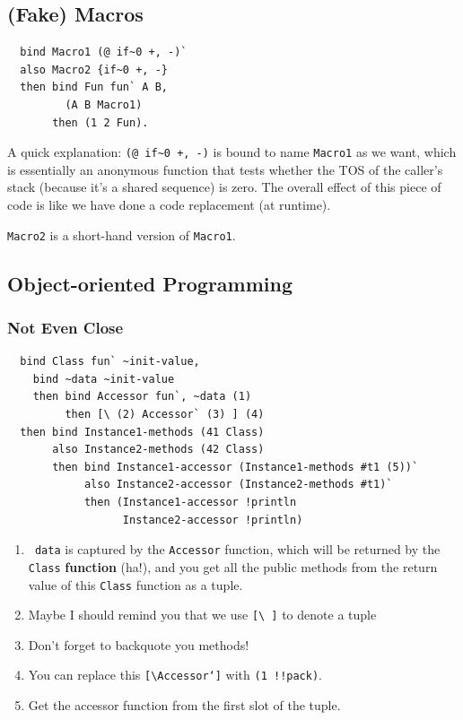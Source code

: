 \documentclass{report}
\newcommand{\mtilde}[1]{\textasciitilde}
\newcommand{\marg}[1]{\texttt{\mtilde ~#1}}
\begin{document}
\subsection{(Fake) Macros}
\label{ssec:macro}
\begin{mdframed}[style=example]
\begin{verbatim}
  bind Macro1 (@ if~0 +, -)`
  also Macro2 {if~0 +, -}
  then bind Fun fun` A B,
         (A B Macro1)
       then (1 2 Fun).
\end{verbatim}
\end{mdframed}

A quick explanation: \texttt{(@ if\textasciitilde 0 +, -)} is bound to name \texttt{Macro1} as we want, which is essentially an anonymous function that tests whether the TOS of the caller's stack (because it's a shared sequence) is zero. The overall effect of this piece of code is like we have done a code replacement (at runtime).

\texttt{Macro2} is a short-hand version of \texttt{Macro1}.

\subsection{Object-oriented Programming}

\subsubsection{Not Even Close}

\begin{mdframed}[style=example]
\begin{verbatim}
  bind Class fun` ~init-value,
    bind ~data ~init-value
    then bind Accessor fun`, ~data (1)
         then [\ (2) Accessor` (3) ] (4)
  then bind Instance1-methods (41 Class)
       also Instance2-methods (42 Class)
       then bind Instance1-accessor (Instance1-methods #t1 (5))`
            also Instance2-accessor (Instance2-methods #t1)`
            then (Instance1-accessor !println
                  Instance2-accessor !println)
\end{verbatim}
\end{mdframed}

\begin{enumerate}
\item \marg{data} is captured by the \texttt{Accessor} function, which will be returned by the \texttt{Class} \textbf{function} (ha!), and you get all the public methods from the return value of this \texttt{Class} function as a tuple.
\item Maybe I should remind you that we use \texttt{[\textbackslash ~]} to denote a tuple
\item Don't forget to backquote you methods!
\item You can replace this \texttt{[\textbackslash Accessor`]} with \texttt{(1 !!pack)}.
\item Get the accessor function from the first slot of the tuple.
\end{enumerate}
\end{document}

